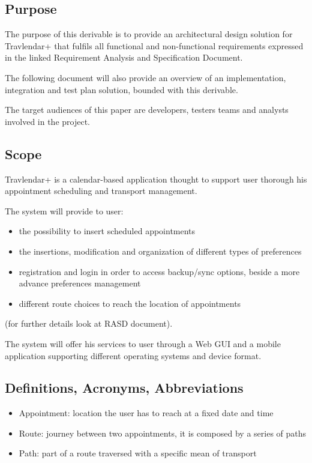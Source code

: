 \subsection{Purpose}

The purpose of this derivable is to provide an architectural design solution for Travlendar+ that fulfils all functional and non-functional requirements expressed in the linked Requirement Analysis and Specification Document.

The following document will also provide an overview of an implementation, integration and test plan solution, bounded with this derivable.

The target audiences of this paper are developers, testers teams and analysts involved in the project.

\subsection{Scope}

Travlendar+ is a calendar-based application thought to support user thorough his appointment scheduling and transport management.

The system will provide to user:

\begin{itemize}
	\item the possibility to insert scheduled appointments
	\item the insertions, modification and organization of different types of preferences
	\item registration and login in order to access backup/sync options, beside a more advance preferences management
	\item different route choices to reach the location of appointments
\end{itemize}

(for further details look at RASD document).

The system will offer his services to user through a Web GUI and a mobile application supporting different operating systems and device format.



\subsection{Definitions, Acronyms, Abbreviations}


\begin{itemize}
	
	
	
	\item Appointment: location the user has to reach at a fixed date and time
	\item Route: journey between two appointments, it is composed by a series of paths
	\item Path: part of a route traversed with a specific mean of transport
\end{itemize}


